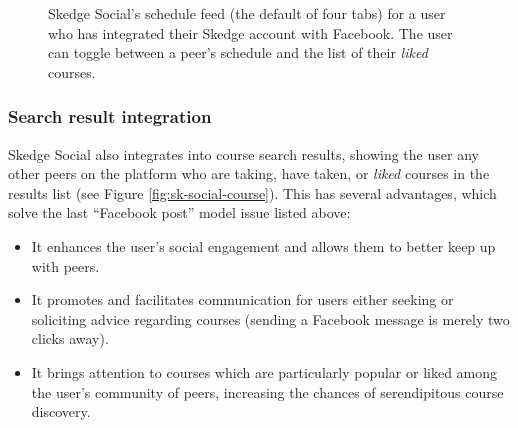     \begin{figure}
      \centering
      \caption[Skedge Social's schedule feed]{Skedge Social's schedule feed (the default of four tabs) for a user who has integrated their Skedge account with Facebook. The user can toggle between a peer's schedule and the list of their \emph{liked} courses.} \label{fig:sk-feed}
    \end{figure}
  
  \subsubsection{Search result integration}

  Skedge Social also integrates into course search results, showing the user any other peers on the platform who are taking, have taken, or \emph{liked} courses in the results list (see Figure \ref{fig:sk-social-course}). This has several advantages, which solve the last ``Facebook post'' model issue listed above:

  \begin{itemize}

  \item It enhances the user's social engagement and allows them to better keep up with peers.
  \item It promotes and facilitates communication for users either seeking or soliciting advice regarding courses (sending a Facebook message is merely two clicks away).
  \item It brings attention to courses which are particularly popular or liked among the user's community of peers, increasing the chances of serendipitous course discovery.

  \end{itemize}

